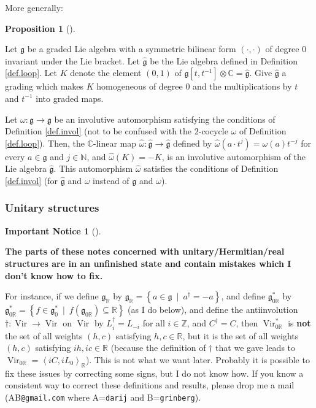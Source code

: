 \documentclass
[numbers=enddot,12pt,final,onecolumn,german,notitlepage]{scrartcl}%
\theoremstyle{definition}
\newtheorem{impnt}[theo]{Important Notice}
\newenvironment{impnot}[1][]
{\begin{impnt}[#1]\begin{leftbar}\color{blue}}
{\end{leftbar}\end{impnt}}
\newtheorem{prop}[theo]{Proposition}
\newenvironment{proposition}[1][]
{\begin{prop}[#1]\begin{leftbar}}
{\end{leftbar}\end{prop}}
\begin{document}
More generally:

\begin{proposition}
Let $\mathfrak{g}$ be a graded Lie algebra with a symmetric bilinear form
$\left(  \cdot,\cdot\right)  $ of degree $0$ invariant under the Lie bracket.
Let $\widehat{\mathfrak{g}}$ be the Lie algebra defined in Definition
\ref{def.loop}. Let $K$ denote the element $\left(  0,1\right)  $ of
$\mathfrak{g}\left[  t,t^{-1}\right]  \otimes\mathbb{C}=\widehat{\mathfrak{g}%
}$. Give $\widehat{\mathfrak{g}}$ a grading which makes $K$ homogeneous of
degree $0$ and the multiplications by $t$ and $t^{-1}$ into graded maps.

Let $\omega:\mathfrak{g}\rightarrow\mathfrak{g}$ be an involutive automorphism
satisfying the conditions of Definition \ref{def.invol} (not to be confused
with the $2$-cocycle $\omega$ of Definition \ref{def.loop}). Then, the
$\mathbb{C}$-linear map $\widehat{\omega}:\widehat{\mathfrak{g}}%
\rightarrow\widehat{\mathfrak{g}}$ defined by $\widehat{\omega}\left(  a\cdot
t^{j}\right)  =\omega\left(  a\right)  t^{-j}$ for every $a\in\mathfrak{g}$
and $j\in\mathbb{N}$, and $\widehat{\omega}\left(  K\right)  =-K$, is an
involutive automorphism of the Lie algebra $\widehat{\mathfrak{g}}$. This
automorphism $\widehat{\omega}$ satisfies the conditions of Definition
\ref{def.invol} (for $\widehat{\mathfrak{g}}$ and $\widehat{\omega}$ instead
of $\mathfrak{g}$ and $\omega$).
\end{proposition}

\subsubsection{Unitary structures}

\begin{impnot}
\textbf{The parts of these notes concerned with unitary/Hermitian/real
structures are in an unfinished state and contain mistakes which I don't know
how to fix.}

For instance, if we define $\mathfrak{g}_{\mathbb{R}}$ by $\mathfrak{g}%
_{\mathbb{R}}=\left\{  a\in\mathfrak{g}\ \mid\ a^{\dag}=-a\right\}  $, and
define $\mathfrak{g}_{0\mathbb{R}}^{\ast}$ by $\mathfrak{g}_{0\mathbb{R}%
}^{\ast}=\left\{  f\in\mathfrak{g}_{0}^{\ast}\ \mid\ f\left(  \mathfrak{g}%
_{0\mathbb{R}}\right)  \subseteq\mathbb{R}\right\}  $ (as I do below), and
define the antiinvolution $\dag:\operatorname*{Vir}\rightarrow
\operatorname*{Vir}$ on $\operatorname*{Vir}$ by $L_{i}^{\dag}=L_{-i}$ for all
$i\in\mathbb{Z}$, and $C^{\dag}=C$, then $\operatorname*{Vir}%
\nolimits_{0\mathbb{R}}^{\ast}$ is \textbf{not} the set of all weights
$\left(  h,c\right)  $ satisfying $h,c\in\mathbb{R}$, but it is the set of all
weights $\left(  h,c\right)  $ satisfying $ih,ic\in\mathbb{R}$ (because the
definition of $\dag$ that we gave leads to $\operatorname*{Vir}%
\nolimits_{0\mathbb{R}}=\left\langle iC,iL_{0}\right\rangle _{\mathbb{R}}$).
This is not what we want later. Probably it is possible to fix these issues by
correcting some signs, but I do not know how. If you know a consistent way to
correct these definitions and results, please drop me a mail
(AB\texttt{@gmail.com} where A=\texttt{darij} and B=\texttt{grinberg}).
\end{impnot}
\end{document}
